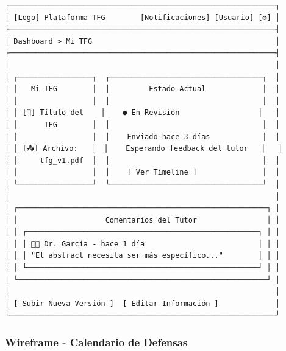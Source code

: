 \documentclass[12pt,a4paper,oneside]{report}
\begin{document}
\begin{lstlisting}
┌─────────────────────────────────────────────────────────────┐
│ [Logo] Plataforma TFG        [Notificaciones] [Usuario] [⚙] │
├─────────────────────────────────────────────────────────────┤
│ Dashboard > Mi TFG                                          │
├─────────────────────────────────────────────────────────────┤
│                                                             │
│ ┌─────────────────┐  ┌───────────────────────────────────┐  │
│ │   Mi TFG        │  │         Estado Actual             │  │
│ │                 │  │                                   │  │
│ │ [📄] Título del    │    ● En Revisión                  │   │
│ │      TFG        │  │                                   │  │
│ │                 │  │    Enviado hace 3 días            │  │
│ │ [📤] Archivo:   │  │    Esperando feedback del tutor   │   │
│ │     tfg_v1.pdf  │  │                                   │  │
│ │                 │  │    [ Ver Timeline ]               │  │
│ └─────────────────┘  └───────────────────────────────────┘  │
│                                                             │
│ ┌─────────────────────────────────────────────────────────┐ │
│ │                    Comentarios del Tutor                │ │
│ │ ┌─────────────────────────────────────────────────────┐ │ │
│ │ │ 👨‍🏫 Dr. García - hace 1 día                          │ │ │
│ │ │ "El abstract necesita ser más específico..."        │ │ │
│ │ └─────────────────────────────────────────────────────┘ │ │
│ └─────────────────────────────────────────────────────────┘ │
│                                                             │
│ [ Subir Nueva Versión ]  [ Editar Información ]             │
└─────────────────────────────────────────────────────────────┘
\end{lstlisting}

\subsubsection{Wireframe - Calendario de
Defensas}\label{wireframe---calendario-de-defensas}
\end{document}
